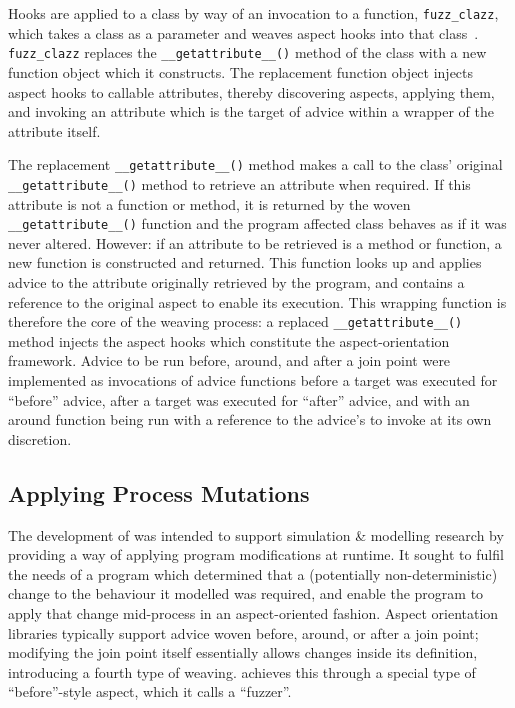 Hooks are applied to a class by way of an invocation to a function,
\lstinline{fuzz_clazz}, which takes a class as a parameter and weaves aspect
hooks into that class~\cite{pdsf_repo,asp_repo}. \lstinline{fuzz_clazz} replaces
the \lstinline{__getattribute__()} method of the class with a new function
object which it constructs. The replacement function object injects aspect hooks
to callable attributes, thereby discovering aspects, applying them, and invoking
an attribute which is the target of advice within a wrapper of the attribute
itself.

The replacement \lstinline{__getattribute__()} method makes a call to the class'
original \lstinline{__getattribute__()} method to retrieve an attribute when
required. If this attribute is not a function or method, it is returned by the
woven \lstinline{__getattribute__()} function and the program affected class
behaves as if it was never altered. However: if an attribute to be retrieved is
a method or function, a new function is constructed and returned. This function
looks up and applies advice to the attribute originally retrieved by the
program, and contains a reference to the original aspect to enable its
execution. This wrapping function is therefore the core of the weaving process:
a replaced \lstinline{__getattribute__()} method injects the aspect hooks which
constitute the aspect-orientation framework. Advice to be run before, around,
and after a join point were implemented as invocations of advice functions
before a target was executed for ``before'' advice, after a target was executed
for ``after'' advice, and with an around function being run with a reference to
the advice's to invoke at its own discretion.

\subsection{Applying Process Mutations}\label{subsec:prior_work_mutations}
The development of \pdsf{} was intended to support simulation \& modelling
research by providing a way of applying program modifications at runtime. It
sought to fulfil the needs of a program which determined that a (potentially
non-deterministic) change to the behaviour it modelled was required, and enable
the program to apply that change mid-process in an aspect-oriented fashion.
Aspect orientation libraries typically support advice woven before, around, or
after a join point; modifying the join point itself essentially allows changes
inside its definition, introducing a fourth type of weaving. \pdsf achieves this
through a special type of ``before''-style aspect, which it calls a ``fuzzer''.

